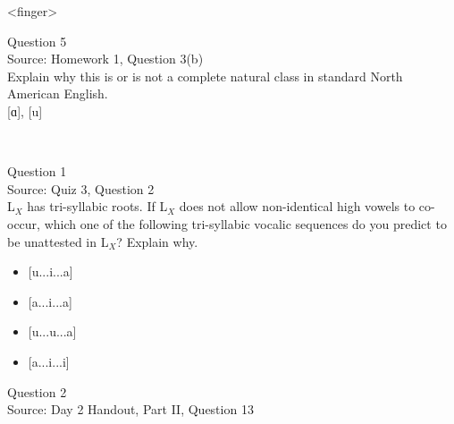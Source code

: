 \documentclass[12pt]{article}
\begin{document}
<finger>


\newpage

{\large Question 5}\\

Source: Homework 1, Question 3(b)\\

Explain why this is or is not a complete natural class in standard North American English.\\

{[ɑ]}, {[u]}


\newpage

\begin{center}
\textbf{{\color{red}{\HUGE END OF EXAM}}}\\

\end{center}
\newpage

\begin{center}
\textbf{{\color{blue}{\HUGE START OF EXAM\\}}}

\textbf{{\color{blue}{\HUGE Student ID: 1887\\}}}

\textbf{{\color{blue}{\HUGE 5:15 - 5:30 PM\\}}}

\end{center}
\newpage

{\large Question 1}\\

Source: Quiz 3, Question 2\\

L$_X$ has tri-syllabic roots. If L$_X$ does not allow non-identical high vowels to co-occur, which one of the following tri-syllabic vocalic sequences do you predict to be unattested in L$_X$? Explain why.\\

\begin{itemize} \item {[u...i...a]} \item {[a...i...a]} \item {[u...u...a]} \item {[a...i...i]} \end{itemize}


\newpage

{\large Question 2}\\

Source: Day 2 Handout, Part II, Question 13\\
\end{document}
